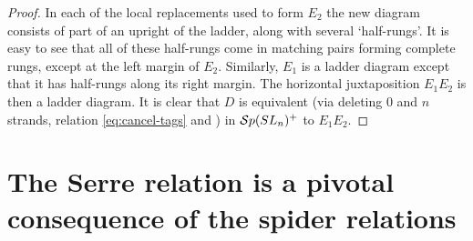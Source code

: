 \documentclass[10pt,leqno]{article}
\begin{document}
\begin{proof}

In each of the local replacements used to form $E_2$ the new diagram consists of part of an upright of the ladder, along with several `half-rungs'. It is easy to see that all of these half-rungs come in matching pairs forming complete rungs, except at the left margin of $E_2$. Similarly, $E_1$ is a ladder diagram except that it has half-rungs along its right margin. The horizontal juxtaposition $E_1 E_2$ is then a ladder diagram.
It is clear that $D$ is equivalent (via deleting $0$ and $n$ strands, relation \ref{eq:cancel-tags} and ) in ${\mathcal{S}p}(SL_n)^+$ to $E_1 E_2$.
\end{proof}

\appendix

\section{The Serre relation is a pivotal consequence of the spider relations}
\label{sec:serre}
\end{document}
